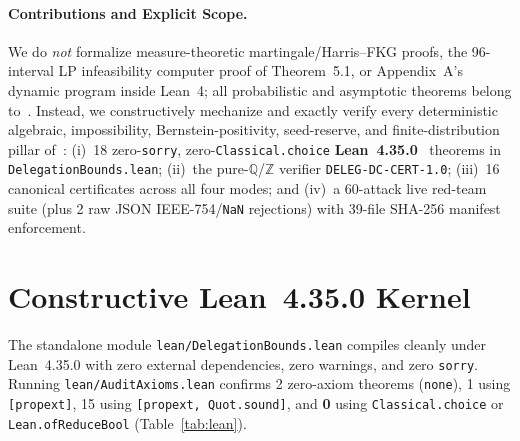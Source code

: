 \documentclass[10pt,twocolumn]{article}
\newcommand{\QQ}{\mathbb{Q}}
\newcommand{\ZZ}{\mathbb{Z}}
\begin{document}
\paragraph{Contributions and Explicit Scope.}
We do \emph{not} formalize measure-theoretic martingale/Harris--FKG proofs, the 96-interval LP infeasibility computer proof of Theorem~5.1, or Appendix~A's dynamic program inside Lean~4; all probabilistic and asymptotic theorems belong to~\cite{abdi2026delegation}. Instead, we constructively mechanize and exactly verify every deterministic algebraic, impossibility, Bernstein-positivity, seed-reserve, and finite-distribution pillar of~\cite{abdi2026delegation}:
(i)~18 zero-\texttt{sorry}, zero-\texttt{Classical.choice} \textbf{Lean~4.35.0}~\cite{demoura2021lean4} theorems in \texttt{DelegationBounds.lean};
(ii)~the pure-$\QQ$/$\ZZ$ verifier \texttt{DELEG-DC-CERT-1.0};
(iii)~16 canonical certificates across all four modes; and
(iv)~a 60-attack live red-team suite (plus 2 raw JSON IEEE-754/\texttt{NaN} rejections) with 39-file SHA-256 manifest enforcement.

\section{Constructive Lean~4.35.0 Kernel}\label{sec:lean}
The standalone module \texttt{lean/DelegationBounds.lean} compiles cleanly under Lean~4.35.0 with zero external dependencies, zero warnings, and zero \texttt{sorry}. Running \texttt{lean/AuditAxioms.lean} confirms 2 zero-axiom theorems (\texttt{none}), 1 using \texttt{[propext]}, 15 using \texttt{[propext, Quot.sound]}, and \textbf{0} using \texttt{Classical.choice} or \texttt{Lean.ofReduceBool} (Table~\ref{tab:lean}).
\end{document}
